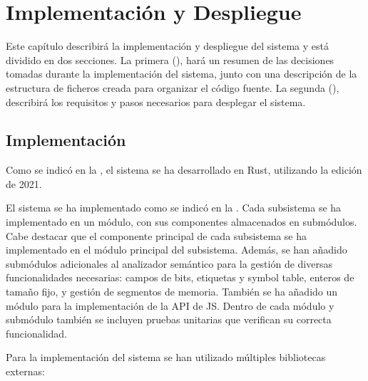 \chapter{Implementación y Despliegue}\label{chap:implementation}

Este capítulo describirá la implementación y despliegue del sistema y está
dividido en dos secciones. La primera (), hará un
resumen de las decisiones tomadas durante la implementación del sistema, junto
con una descripción de la estructura de ficheros creada para organizar el código
fuente. La segunda (), describirá los requisitos y pasos
necesarios para desplegar el sistema.

\section{Implementación}\label{sec:implementation}

Como se indicó en la , el sistema se ha desarrollado en
Rust, utilizando la edición de 2021.

El sistema se ha implementado como se indicó en la .
Cada subsistema se ha implementado en un módulo, con sus componentes almacenados
en submódulos. Cabe destacar que el componente principal de cada subsistema se
ha implementado en el módulo principal del subsistema. Además, se han añadido
submódulos adicionales al analizador semántico para la gestión de diversas
funcionalidades necesarias: campos de bits, etiquetas y \gls{symbol table},
enteros de tamaño fijo, y gestión de segmentos de memoria. También se ha añadido
un módulo para la implementación de la \gls{API} de \gls{JS}. Dentro de cada
módulo y submódulo también se incluyen pruebas unitarias que verifican su
correcta funcionalidad.

\noindent
Para la implementación del sistema se han utilizado múltiples bibliotecas
externas:

\newcommand{\libref}[1]{\textit{#1} \parencite{#1}}


